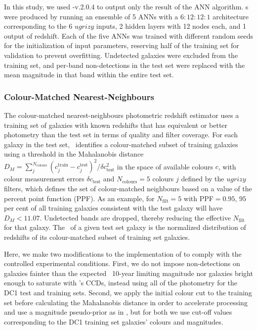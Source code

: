 In this study, we used \annz-v.2.0.4 to output only the result of the ANN algorithm.
\Pzpdf s were produced by running an ensemble of 5 ANNs with a $6:12:12:1$ architecture corresponding to the 6 $ugrizy$ inputs, 2 hidden layers with 12 nodes each, and 1 output of redshift.
Each of the five ANNs was trained with different random seeds for the initialization of input parameters, reserving half of the training set for validation to prevent overfitting.
Undetected galaxies were excluded from the training set, and per-band non-detections in the test set were replaced with the mean magnitude in that band within the entire test set.

\subsubsection{Colour-Matched Nearest-Neighbours}
\label{sec:cmnn}

The colour-matched nearest-neighbours photometric redshift estimator \citep[\cmnn,][]{Graham:17} uses a training set of galaxies with known redshifts that has equivalent or better photometry than the test set in terms of quality and filter coverage.
For each galaxy in the test set, \cmnn\ identifies a colour-matched subset of training galaxies using a threshold in the Mahalanobis distance $D_M = \sum_{j}^{N_{\mathrm{colours}}} (c^{\mathrm{train}}_{j} - c^{\mathrm{test}}_{j})^{2} / \delta c_{\mathrm{test}}^2$ in the space of available colours $c$, with colour measurement errors $\delta c_{\mathrm{test}}$ and $N_{\mathrm{colours}} = 5$ colours $j$ defined by the $ugrizy$ filters, which defines the set of colour-matched neighbours based on a value of the percent point function (PPF).
As an example, for $N_{\mathrm{filt}}=5$ with PPF$=0.95$, $95$ per cent of all training galaxies consistent with the test galaxy will have $D_M < 11.07$.
Undetected bands are dropped, thereby reducing the effective $N_{\mathrm{filt}}$ for that galaxy.
The \pzpdf\ of a given test set galaxy is the normalized distribution of redshifts of its colour-matched subset of training set galaxies.

Here, we make two modifications to the implementation of \citet{Graham:17} to comply with the controlled experimental conditions.
First, we do not impose non-detections on galaxies fainter than the expected \lsst\ 10-year limiting magnitude nor galaxies bright enough to saturate with \lsst's CCDs, instead using all of the photometry for the DC1 test and training sets.
Second, we apply the initial colour cut to the training set before calculating the Mahalanobis distance in order to accelerate processing and use a magnitude pseudo-prior as in \citet{Graham:17}, but for both we use cut-off values corresponding to the DC1 training set galaxies' colours and magnitudes.

